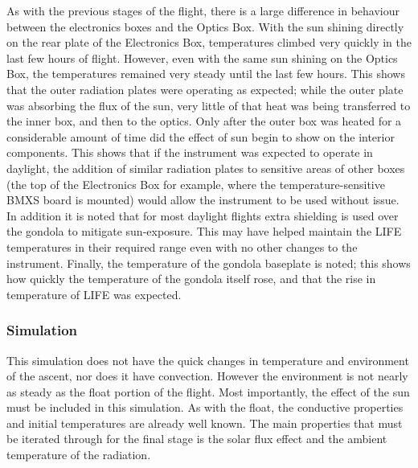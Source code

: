 As with the previous stages of the flight, there is a large difference in behaviour between the electronics boxes and the Optics Box. With the sun shining directly on the rear plate of the Electronics Box, temperatures climbed very quickly in the last few hours of flight. However, even with the same sun shining on the Optics Box, the temperatures remained very steady until the last few hours. This shows that the outer radiation plates were operating as expected; while the outer plate was absorbing the flux of the sun, very little of that heat was being transferred to the inner box, and then to the optics. Only after the outer box was heated for a considerable amount of time did the effect of sun begin to show on the interior components. This shows that if the instrument was expected to operate in daylight, the addition of similar radiation plates to sensitive areas of other boxes (the top of the Electronics Box for example, where the temperature-sensitive BMXS board is mounted) would allow the instrument to be used without issue. In addition it is noted that for most daylight flights extra shielding is used over the gondola to mitigate sun-exposure. This may have helped maintain the LIFE temperatures in their required range even with no other changes to the instrument. Finally, the temperature of the gondola baseplate is noted; this shows how quickly the temperature of the gondola itself rose, and that the rise in temperature of LIFE was expected.

\subsubsection{Simulation}
This simulation does not have the quick changes in temperature and environment of the ascent, nor does it have convection. However the environment is not nearly as steady as the float portion of the flight. Most importantly, the effect of the sun must be included in this simulation. As with the float, the conductive properties and initial temperatures are already well known. The main properties that must be iterated through for the final stage is the solar flux effect and the ambient temperature of the radiation.

